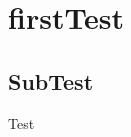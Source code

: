 \documentclass[a4paper, 11pt, oneside, BCOR=0mm, DIV=15]{scrbook} %
\begin{document}
	\chapter{firstTest}
	
	\section{SubTest}
	
	\begin{defn}
		Test
	\end{defn}
\end{document}
